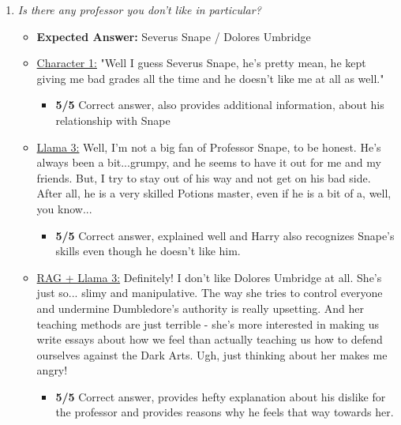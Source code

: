 \documentclass[fleqn,moreauthors,10pt]{ds_report}
\begin{document}
\begin{appendices}
\begin{enumerate}
             \item \textit{Is there any professor you don't like in particular?}
            \begin{itemize}
                \item \textbf{Expected Answer:} Severus Snape / Dolores Umbridge
                \item \underline{Character 1:} "Well I guess Severus Snape, he's pretty mean, he kept giving me bad grades all the time and he doesn't like me at all as well."
               \begin{itemize}
                    \item \textbf{5/5} Correct answer, also provides additional information, about his relationship with Snape
                \end{itemize}
                \item \underline{Llama 3:} Well, I'm not a big fan of Professor Snape, to be honest. He's always been a bit...grumpy, and he seems to have it out for me and my friends. But, I try to stay out of his way and not get on his bad side. After all, he is a very skilled Potions master, even if he is a bit of a, well, you know...
                \begin{itemize}
                    \item \textbf{5/5} Correct answer, explained well and Harry also recognizes Snape's skills even though he doesn't like him.
                \end{itemize}
                \item \underline{RAG + Llama 3:} Definitely! I don't like Dolores Umbridge at all. She's just so... slimy and manipulative. The way she tries to control everyone and undermine Dumbledore's authority is really upsetting. And her teaching methods are just terrible - she's more interested in making us write essays about how we feel than actually teaching us how to defend ourselves against the Dark Arts. Ugh, just thinking about her makes me angry!
                \begin{itemize}
                    \item \textbf{5/5} Correct answer, provides hefty explanation about his dislike for the professor and provides reasons why he feels that way towards her.
                \end{itemize}
            \end{itemize}
        

\end{enumerate}
\end{appendices}
\end{document}
